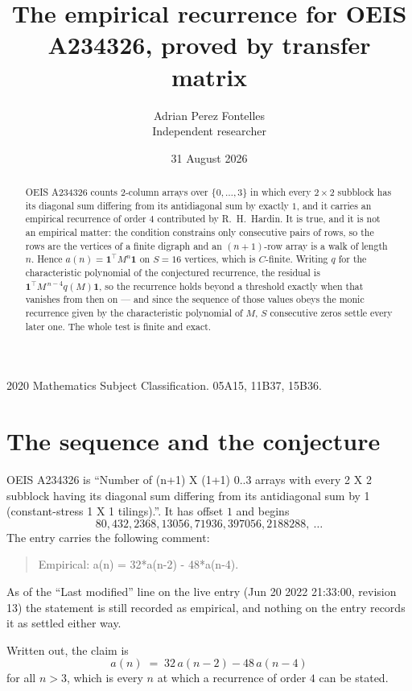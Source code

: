 \documentclass[11pt,a4paper]{article}
\title{The empirical recurrence for OEIS A234326, proved by transfer matrix}
\author{Adrian Perez Fontelles\\ \small Independent researcher}
\date{31 August 2026}
\theoremstyle{plain}
\theoremstyle{definition}
\begin{document}
\maketitle

\begin{abstract}
OEIS A234326 counts $2$-column arrays over $\{0,\dots,3\}$ in which every
$2\times2$ subblock has its diagonal sum differing from its antidiagonal sum by
exactly $1$, and it
carries an empirical recurrence of order $4$ contributed by R.~H.~Hardin. It is true,
and it is not an empirical matter: the condition constrains only consecutive pairs of rows,
so the rows are the vertices of a finite digraph and an $(n+1)$-row array is a walk of
length $n$. Hence $a(n)=\mathbf{1}^{\!\top}M^{n}\mathbf{1}$ on $S=16$ vertices, which
is $C$-finite. Writing $q$ for the characteristic polynomial of the conjectured recurrence,
the residual is $\mathbf{1}^{\!\top}M^{\,n-4}q(M)\mathbf{1}$, so the recurrence
holds beyond a threshold exactly when that vanishes from then on --- and since the sequence
of those values obeys the monic recurrence given by the characteristic polynomial of $M$,
$S$ consecutive zeros settle every later one. The whole test is finite and exact.
\end{abstract}

\noindent\small 2020 Mathematics Subject Classification. 05A15, 11B37, 15B36.\normalsize

\section{The sequence and the conjecture}

OEIS A234326 is ``Number of (n+1) X (1+1) 0..3 arrays with every 2 X 2 subblock having its diagonal sum differing from its antidiagonal sum by 1 (constant-stress 1 X 1 tilings).''. It has offset
$1$ and begins
\[
80, 432, 2368, 13056, 71936, 397056, 2188288,\ \dots
\]
The entry carries the following comment:
\begin{quote}\small
Empirical: a(n) = 32*a(n-2) - 48*a(n-4).
\end{quote}
As of the ``Last modified'' line on the live entry (Jun 20 2022 21:33:00, revision 13) the statement is
still recorded as empirical, and nothing on the entry records it as settled either way.

Written out, the claim is
\begin{equation}\label{eq:conj}
a(n)\;=\;32\,a(n-2) - 48\,a(n-4)
\end{equation}
for all $n>3$, which is every $n$ at which a recurrence of order $4$ can be
stated.
\end{document}

